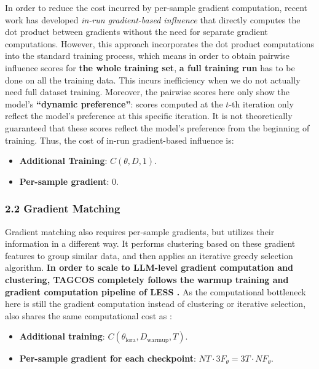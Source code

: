 In order to reduce the cost incurred by per-sample gradient computation, recent work has developed \textit{in-run gradient-based influence} that directly computes the dot product between gradients without the need for separate gradient computations. However, this approach incorporates the dot product computations into the standard training process, which means in order to obtain pairwise influence scores for \textbf{the whole training set}, \textbf{a full training run} has to be done on all the training data. This incurs inefficiency when we do not actually need full dataset training. Moreover, the pairwise scores here only show the model’s \textbf{``dynamic preference''}: scores computed at the $t$-th iteration only reflect the model’s preference at this specific iteration. It is not theoretically guaranteed that these scores reflect the model’s preference from the beginning of training. Thus, the cost of in-run gradient-based influence is:

\begin{itemize}
    \item \textbf{Additional Training}: $C(\theta, D, 1)$.
    \item \textbf{Per-sample gradient}: 0.
\end{itemize}

\subsubsection*{2.2 Gradient Matching}

Gradient matching also requires per-sample gradients, but utilizes their information in a different way. It performs clustering based on these gradient features to group similar data, and then applies an iterative greedy selection algorithm. \textbf{In order to scale to LLM-level gradient computation and clustering, TAGCOS \cite{TAGCOS} completely follows the warmup training and gradient computation pipeline of LESS \cite{LESS}.} As the computational bottleneck here is still the gradient computation instead of clustering or iterative selection, \cite{TAGCOS} also shares the same computational cost as \cite{xia2024less}:

\begin{itemize}
    \item \textbf{Additional training}: $C(\theta_{\text{lora}}, D_{\text{warmup}}, T)$.
    \item \textbf{Per-sample gradient for each checkpoint}: $NT \cdot 3F_{\theta} = 3 T \cdot NF_{\theta}$.
\end{itemize}

